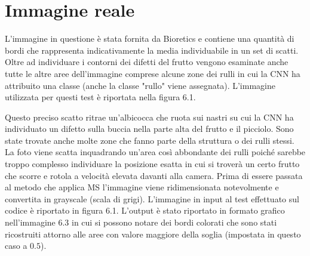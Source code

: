 \documentclass[12pt,a4paper]{report}
\begin{document}
{\section{Immagine reale}
L'immagine in questione è stata fornita da Bioretics e contiene una quantità di bordi che rappresenta indicativamente la media individuabile in un set di scatti. Oltre ad individuare i contorni dei difetti del frutto vengono esaminate anche tutte le altre aree dell'immagine comprese alcune zone dei rulli in cui la CNN ha attribuito una classe (anche la classe "rullo" viene assegnata).
L'immagine utilizzata per questi test è riportata nella figura 6.1.
\begin{figure}[H]
\centering
\begin{floatrow}[1]
\end{floatrow}
\end{figure} 
Questo preciso scatto ritrae un'albicocca che ruota sui nastri su cui la CNN ha individuato un difetto sulla buccia nella parte alta del frutto e il picciolo. Sono state trovate anche molte zone che fanno parte della struttura o dei rulli stessi. La foto viene scatta inquadrando un'area così abbondante dei rulli poiché sarebbe troppo complesso individuare la posizione esatta in cui si troverà un certo frutto che scorre e rotola a velocità elevata davanti alla camera.
\newpage
Prima di essere passata al metodo che applica MS l'immagine viene ridimensionata notevolmente e convertita in grayscale (scala di grigi). L'immagine in input al test effettuato sul codice è riportato in figura 6.1.
L'output è stato riportato in formato grafico nell'immagine 6.3 in cui si possono notare dei bordi colorati che sono stati ricostruiti attorno alle aree con valore maggiore della soglia (impostata in questo caso a $0.5$).
\begin{figure}[H]
\centering
\begin{floatrow}[1]
\end{floatrow}
\end{figure} 

}
\end{document}
